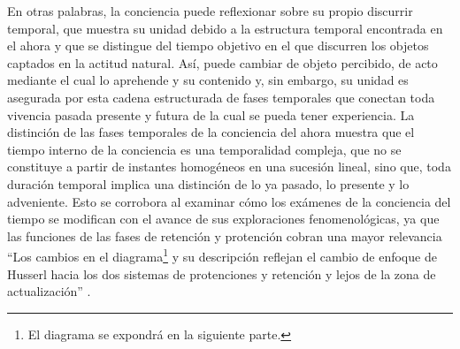 En otras palabras, la conciencia puede reflexionar sobre su propio
discurrir temporal, que muestra su unidad debido a la estructura
temporal encontrada en el ahora y que se distingue del tiempo objetivo
en el que discurren los objetos captados en la actitud natural. Así,
puede cambiar de objeto percibido, de acto mediante el cual lo aprehende
y su contenido y, sin embargo, su unidad es asegurada por esta cadena
estructurada de fases temporales que conectan toda vivencia pasada
presente y futura de la cual se pueda tener experiencia. La distinción
de las fases temporales de la conciencia del ahora muestra que el tiempo
interno de la conciencia es una temporalidad compleja, que no se
constituye a partir de instantes homogéneos en una sucesión lineal, sino
que, toda duración temporal implica una distinción de lo ya pasado, lo
presente y lo adveniente. Esto se corrobora al examinar cómo los
exámenes de la conciencia del tiempo se modifican con el avance de sus
exploraciones fenomenológicas, ya que las funciones de las fases de
retención y protención cobran una mayor relevancia ``Los cambios en el
diagrama\footnote{El diagrama se expondrá en la siguiente parte.} y su
descripción reflejan el cambio de enfoque de Husserl hacia los dos
sistemas de protenciones y retención y lejos de la zona de
actualización'' \cite[p.~135]{rodemeyer2003}.